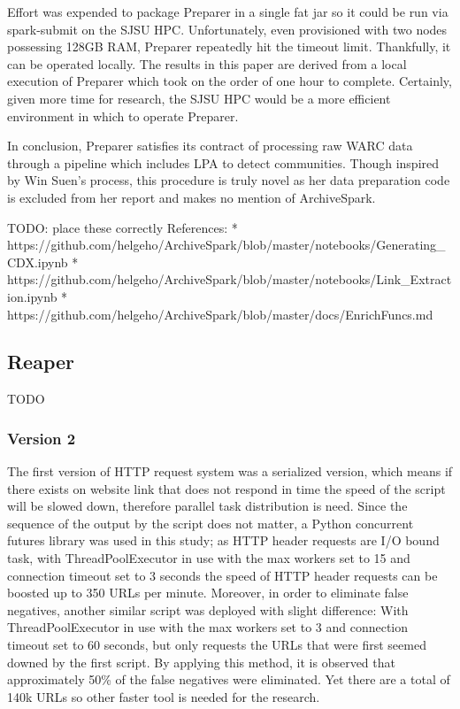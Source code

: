 \documentclass[conference]{IEEEtran}
\begin{document}
Effort was expended to package Preparer in a single fat jar so it could be run via spark-submit on the SJSU HPC. Unfortunately, even provisioned with two nodes possessing 128GB RAM, Preparer repeatedly hit the timeout limit. Thankfully, it can be operated locally. The results in this paper are derived from a local execution of Preparer which took on the order of one hour to complete. Certainly, given more time for research, the SJSU HPC would be a more efficient environment in which to operate Preparer.

In conclusion, Preparer satisfies its contract of processing raw WARC data through a pipeline which includes LPA to detect communities. Though inspired by Win Suen's process, this procedure is truly novel as her data preparation code is excluded from her report and makes no mention of ArchiveSpark.

TODO: place these correctly
References:
* https://github.com/helgeho/ArchiveSpark/blob/master/notebooks/Generating_CDX.ipynb
* https://github.com/helgeho/ArchiveSpark/blob/master/notebooks/Link_Extraction.ipynb
* https://github.com/helgeho/ArchiveSpark/blob/master/docs/EnrichFuncs.md

\subsection{Reaper}

TODO
\subsubsection{Version 2}
The first version of HTTP request system was a serialized version, 
which means if there exists on website link that does not respond in time the speed of the script will be slowed down, 
therefore parallel task distribution is need. 
Since the sequence of the output by the script does not matter, 
a Python concurrent futures library was used in this study; 
as HTTP header requests are I/O bound task, 
with ThreadPoolExecutor in use with the max workers set to 15 and connection timeout set to 3 seconds the speed of HTTP header requests can be boosted up to 350 URLs per minute.
 Moreover, in order to eliminate false negatives, 
another similar script was deployed with slight difference: 
With ThreadPoolExecutor in use with the max workers set to 3 and connection timeout set to 60 seconds, but only requests the URLs that were first seemed downed by the first script. By applying this method, 
it is observed that approximately 50\% of the false negatives were eliminated. 
Yet there are a total of 140k URLs so other faster tool is needed for the research.
\end{document}
